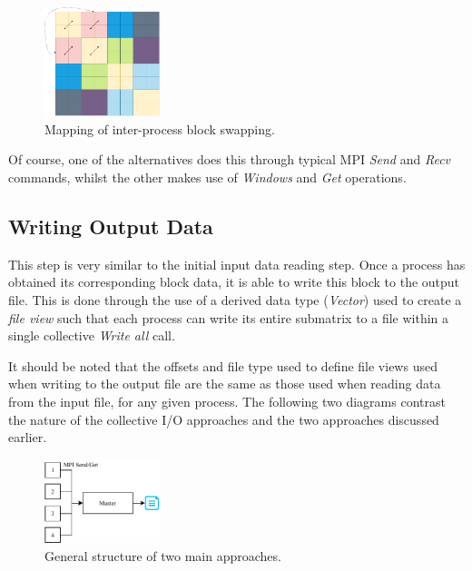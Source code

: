 \documentclass[journal,10pt,a4paper]{IEEEtran}
\begin{document}
\begin{figure}[H]
    \centering
    \includegraphics[width=0.3\textwidth]{block.pdf}
    \caption{Mapping of inter-process block swapping.}
    \label{fig:my_label}
\end{figure}

Of course, one of the alternatives does this through typical MPI \textit{Send} and \textit{Recv} commands, whilst the other makes use of \textit{Windows} and \textit{Get} operations.



\subsection{Writing Output Data}

This step is very similar to the initial input data reading step. Once a process has obtained its corresponding block data, it is able to write this block to the output file. This is done through the use of a derived data type (\textit{Vector}) used to create a \textit{file view} such that each process can write its entire submatrix to a file within a single collective \textit{Write all} call.%

It should be noted that the offsets and file type used to define file views used when writing to the output file are the same as those used when reading data from the input file, for any given process. The following two diagrams contrast the nature of the collective I/O approaches and the two approaches discussed earlier.

\begin{figure}[H]
    \centering
    \includegraphics[width=0.3\textwidth]{norm.pdf}
    \caption{General structure of two main approaches.}
    \label{fig:my_label}
\end{figure}
\end{document}
